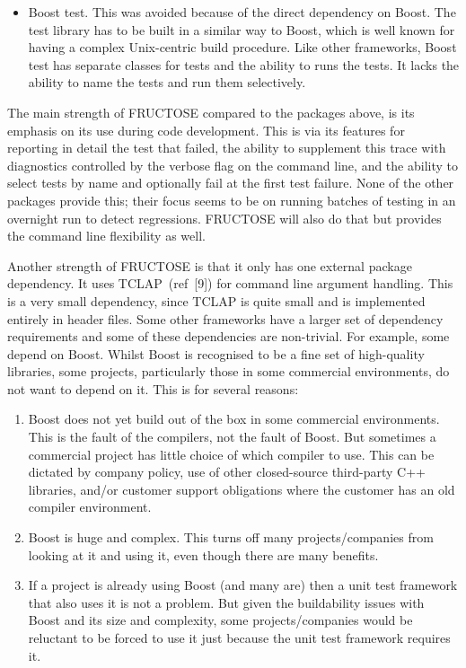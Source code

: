 \documentclass{book}
\begin{document}
\begin{itemize}
\item Boost test.
This was avoided because of the direct dependency on Boost.
The test library has to be built in a similar way to Boost,
which is well known for having a complex Unix-centric build procedure.
Like other frameworks, Boost test has separate classes for tests
and the ability to runs the tests. It lacks the ability to name the
tests and run them selectively.
\end{itemize}


The main strength of FRUCTOSE compared to the packages above,
is its emphasis on its use during code development.
This is via its features for reporting in detail the test that failed,
the ability to supplement this trace with diagnostics
controlled by the verbose flag on the command line,
and the ability to select tests by name and optionally
fail at the first test failure.
None of the other packages provide this; their focus seems
to be on running batches of testing in an overnight run
to detect regressions. FRUCTOSE will also do that but provides
the command line flexibility as well.

Another strength of FRUCTOSE is that it only has one
external package dependency. It uses TCLAP~(ref~[9])
for command line argument handling. This is a very small dependency,
since TCLAP is quite small and is implemented entirely in header files.
Some other frameworks have a larger set of dependency requirements
and some of these dependencies are non-trivial.
For example, some depend on Boost. Whilst Boost is recognised
to be a fine set of high-quality libraries, 
some projects, particularly those in some commercial
environments, do not want to depend on it.
This is for several reasons:
\begin{enumerate}
\item Boost does not yet build out of the box in some
commercial environments. This is the fault of the compilers,
not the fault of Boost. But sometimes a commercial project has
little choice of which compiler to use. This can be dictated by
company policy, use of other closed-source third-party C++
libraries, and/or customer support obligations where the customer
has an old compiler environment.

\item Boost is huge and complex. 
This turns off many projects/companies from looking at it and using it,
even though there are many benefits.

\item If a project is already using Boost (and many are)
then a unit test framework that also uses it is not a problem.
But given the buildability issues with Boost and its size
and complexity, some projects/companies would be reluctant to
be forced to use it just because the unit test framework
requires it. 
\end{enumerate}
\end{document}
